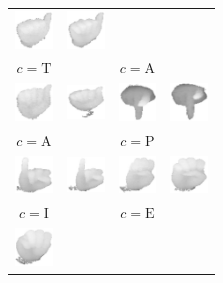 \documentclass[a4paper]{article}
\begin{document}
\begin{figure}
\begin{tabular}{cccc}
\includegraphics[width=1cm]{img/S02_C10_0146.eps} & 
\includegraphics[width=1cm]{img/S02_C10m_0030.eps} \\ 
$c=\text{T}$ & & $c=\text{A}$ \\
\includegraphics[width=1cm]{img/S03_C10m_0181.eps} & 
\includegraphics[width=1cm]{img/S03_C10_0138.eps} & 
\includegraphics[width=1cm]{img/S03_C24_0055.eps} & 
\includegraphics[width=1cm]{img/S03_C24m_0088.eps} \\ 
$c=\text{A}$ & & $c=\text{P}$ \\
\includegraphics[width=1cm]{img/S01_C18m_0114.eps} & 
\includegraphics[width=1cm]{img/S01_C18_0051.eps} & 
\includegraphics[width=1cm]{img/S01_C14_0097.eps} & 
\includegraphics[width=1cm]{img/S01_C14m_0009.eps} \\ 
$c=\text{I}$ & & $c=\text{E}$ \\
\includegraphics[width=1cm]{img/S01_C21m_0001.eps} & 

\end{tabular}
\end{figure}
\end{document}
